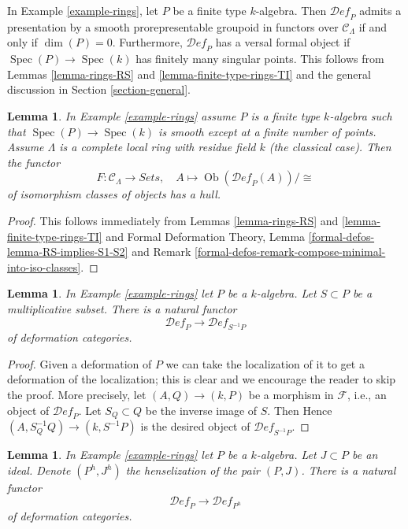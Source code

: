 \documentclass{stacks-project}
\theoremstyle{plain}
\newtheorem{lemma}[subsection]{Lemma}
\theoremstyle{definition}
\theoremstyle{remark}
\numberwithin{equation}{subsection}
\def\Spec{\mathop{\mathrm{Spec}}}
\def\Ob{\mathop{\mathrm{Ob}}\nolimits}
\def\Deformationcategory{\mathcal{D}\!\mathit{ef}}
\begin{document}
\noindent
In Example \ref{example-rings}, let $P$ be a finite type
$k$-algebra. Then $\Deformationcategory_P$
admits a presentation by a smooth prorepresentable groupoid in functors
over $\mathcal{C}_\Lambda$ if and only if $\dim(P) = 0$.
Furthermore, $\Deformationcategory_P$ has a versal formal
object if $\Spec(P) \to \Spec(k)$ has finitely many
singular points. This follows from Lemmas \ref{lemma-rings-RS} and
\ref{lemma-finite-type-rings-TI}
and the general discussion in Section \ref{section-general}.

\begin{lemma}
\label{lemma-rings-hull}
In Example \ref{example-rings} assume $P$ is a finite type
$k$-algebra such that $\Spec(P) \to \Spec(k)$ is smooth except
at a finite number of points.
Assume $\Lambda$ is a complete local ring with residue field $k$
(the classical case). Then the functor
$$
F : \mathcal{C}_\Lambda \longrightarrow \textit{Sets},\quad
A \longmapsto \Ob(\Deformationcategory_P(A))/\cong
$$
of isomorphism classes of objects has a hull.
\end{lemma}

\begin{proof}
This follows immediately from Lemmas \ref{lemma-rings-RS} and
\ref{lemma-finite-type-rings-TI} and
Formal Deformation Theory, Lemma \ref{formal-defos-lemma-RS-implies-S1-S2}
and Remark \ref{formal-defos-remark-compose-minimal-into-iso-classes}.
\end{proof}

\begin{lemma}
\label{lemma-localization}
In Example \ref{example-rings} let $P$ be a $k$-algebra.
Let $S \subset P$ be a multiplicative subset. There is a natural functor
$$
\Deformationcategory_P \longrightarrow \Deformationcategory_{S^{-1}P}
$$
of deformation categories.
\end{lemma}

\begin{proof}
Given a deformation of $P$ we can take the localization
of it to get a deformation of the localization; this is
clear and we encourage the reader to skip the proof. More precisely,
let $(A, Q) \to (k, P)$ be a morphism in $\mathcal{F}$, i.e.,
an object of $\Deformationcategory_P$. Let $S_Q \subset Q$ be the
inverse image of $S$. Then
Hence $(A, S_Q^{-1}Q) \to (k, S^{-1}P)$
is the desired object of $\Deformationcategory_{S^{-1}P}$.
\end{proof}

\begin{lemma}
\label{lemma-henselization}
In Example \ref{example-rings} let $P$ be a $k$-algebra.
Let $J \subset P$ be an ideal.
Denote $(P^h, J^h)$ the henselization of the pair $(P, J)$.
There is a natural functor
$$
\Deformationcategory_P \longrightarrow \Deformationcategory_{P^h}
$$
of deformation categories.
\end{lemma}
\end{document}
